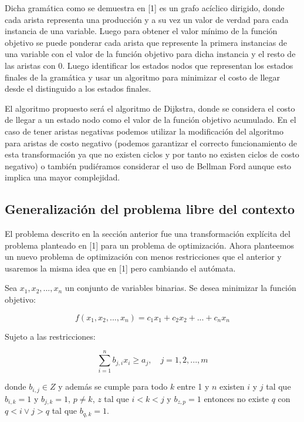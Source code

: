 \documentclass{article}
\begin{document}
Dicha gramática como se demuestra en [1] es un grafo acíclico dirigido, donde cada arista representa una producción y a su vez un valor de verdad
para cada instancia de una variable. Luego para obtener el valor mínimo de la función objetivo se puede ponderar cada arista que represente la primera instancias
de una variable con el valor de la función objetivo para dicha instancia y el resto de las aristas con 0. Luego identificar los estados nodos que representan los estados finales de la gramática 
y usar un algoritmo para minimizar el costo de llegar desde el distinguido a los estados finales.

El algoritmo propuesto será el algoritmo de Dijkstra, donde se considera el costo de llegar a un estado nodo como el valor de la función objetivo acumulado.
En el caso de tener aristas negativas podemos utilizar la modificación del algoritmo para aristas de costo negativo (podemos garantizar el correcto funcionamiento
de esta transformación ya que no existen ciclos y por tanto no existen ciclos de costo negativo) o también pudiéramos considerar el uso de Bellman Ford aunque esto
implica una mayor complejidad.
    
\subsection*{Generalización del problema libre del contexto}

El problema descrito en la sección anterior fue una transformación explícita del problema planteado en [1] para un problema de optimización.
Ahora planteemos un nuevo problema de optimización con menos restricciones que el anterior y usaremos la misma idea que en [1] pero cambiando
el autómata.

Sea $x_1, x_2, ..., x_n$ un conjunto de variables binarias. Se desea minimizar la función objetivo:

\begin{equation}
    f(x_1, x_2, ..., x_n) = c_1x_1 + c_2x_2 + ... + c_nx_n
\end{equation}

Sujeto a las restricciones:

\begin{equation}
    \sum_{i = 1}^{n} b_{j,i}x_i \geq a_j, \quad j = 1, 2, ..., m
\end{equation}

donde $b_{i,j}\in Z$ y además se cumple para todo $k$ entre 1 y $n$ existen $i$ y $j$ tal que $b_{i,k} = 1$ y $b_{j,k} = 1$, $p\neq k$, 
$z$ tal que $i<k<j$ y $b_{z,p} = 1$ entonces no existe $q$ con $q<i \lor j>q$ tal que $b_{q,k}=1$.
\end{document}
